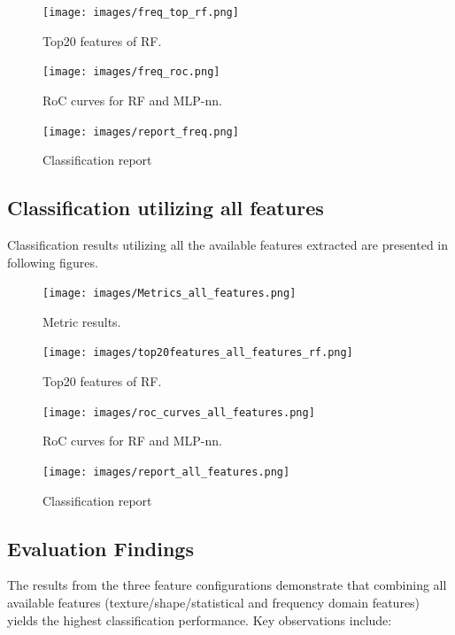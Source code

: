 \documentclass[11pt,a4paper]{article}
\begin{document}
		\begin{figure}[h]
			\centering
			\texttt{[image: images/freq\_top\_rf.png]}
			\caption{Top20 features of RF.}
			\label{fig1:}
		\end{figure}		

		\begin{figure}[H]
			\centering
			\texttt{[image: images/freq\_roc.png]}
			\caption{RoC curves for RF and MLP-nn.}
			\label{fig1:}
		\end{figure}		

		\begin{figure}[H]
			\centering
			\texttt{[image: images/report\_freq.png]}
			\caption{Classification report}
			\label{fig1:}
		\end{figure}		


	\subsection{Classification utilizing all features}

		Classification results utilizing all the available features extracted are presented in following figures.
		\begin{figure}[H]
			\centering
			\texttt{[image: images/Metrics\_all\_features.png]}
			\caption{Metric results.}
			\label{fig1:}
		\end{figure}		

		\begin{figure}[H]
			\centering
			\texttt{[image: images/top20features\_all\_features\_rf.png]}
			\caption{Top20 features of RF.}
			\label{fig1:}
		\end{figure}		

		\begin{figure}[H]
			\centering
			\texttt{[image: images/roc\_curves\_all\_features.png]}
			\caption{RoC curves for RF and MLP-nn.}
			\label{fig1:}
		\end{figure}		

		\begin{figure}[H]
			\centering
			\texttt{[image: images/report\_all\_features.png]}
			\caption{Classification report}
			\label{fig1:}
		\end{figure}		


\subsection{Evaluation Findings}

The results from the three feature configurations demonstrate that combining all available 
features (texture/shape/statistical and frequency domain features) yields the highest 
classification performance. Key observations include:
\end{document}
